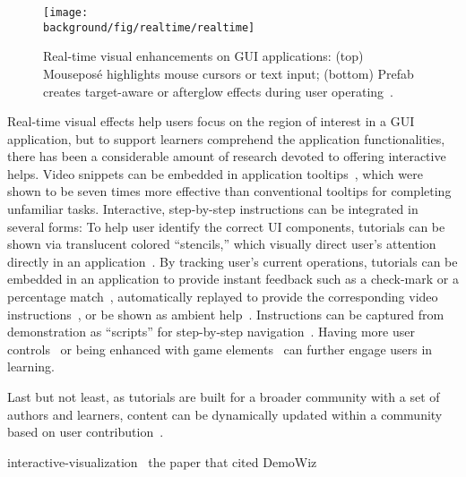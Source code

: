 \begin{figure*}[t!]
  \centering
  \texttt{[image: \\background/fig/realtime/realtime]}
  \caption{Real-time visual enhancements on GUI applications: (top) Mouseposé highlights mouse cursors or text input; (bottom) Prefab creates target-aware or afterglow effects during user operating~\cite{Dixon:2010fb}.}
  \label{fig:related_realtime}
\end{figure*}

Real-time visual effects help users focus on the region of interest in a GUI application, but to support learners comprehend the application functionalities, there has been a considerable amount of research devoted to offering interactive helps.
%
Video snippets can be embedded in application tooltips~\cite{Grossman:2010wr}, which were shown to be seven times more effective than conventional tooltips for completing unfamiliar tasks.
%
Interactive, step-by-step instructions can be integrated in several forms:
%
To help user identify the correct UI components, tutorials can be shown via translucent colored ``stencils,'' which visually direct user's attention directly in an application~\cite{Kelleher:2005:STD:1054972.1055047}.
%
By tracking user's current operations, tutorials can be embedded in an application to provide instant feedback such as a check-mark or a percentage match~\cite{Fernquist:2011:SRE:2047196.2047245}, automatically replayed to provide the corresponding video instructions~\cite{Pongnumkul:2011ju}, or be shown as ambient help~\cite{Matejka:2011:AH:1978942.1979349}.
%
Instructions can be captured from demonstration as ``scripts'' for step-by-step navigation~\cite{Bergman:2005:DocWizards}. Having more user controls~\cite{Lieberman:2014:SML:2557500.2557543} or being enhanced with game elements~\cite{Li:2014:CGM:2556288.2556954, Dontcheva:2014:CCL:2556288.2557217} can further engage users in learning.

Last but not least, as tutorials are built for a broader community with a set of authors and learners, content can be dynamically updated within a community based on user contribution~\cite{Lafreniere:2013ff,Matejka:2009:CCR:1622176.1622214, Bunt:2014:TPI:2556288.2557118}.

interactive-visualization~\cite{Kwon:2016:CEO:2858036.2858101}
the paper that cited DemoWiz~\cite{Nguyen:2015:MST:2702123.2702209}


